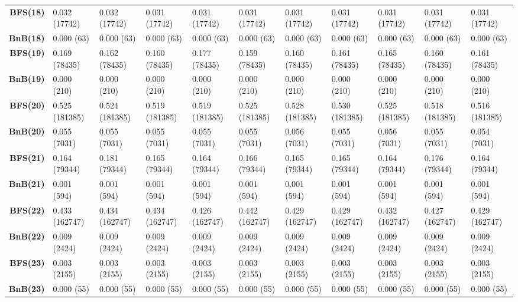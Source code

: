 \begin{table}[ht]
\begin{adjustbox}{width=1.5\textwidth,center}
\begin{tabular}{r|llllllllll}
\textbf{BFS(18)} & 0.032 (17742) & 0.032 (17742) & 0.031 (17742) & 0.031 (17742) & 0.031 (17742) & 0.031 (17742) & 0.031 (17742) & 0.031 (17742) & 0.031 (17742) & 0.031 (17742) \\
\textbf{BnB(18)} & 0.000 (63) & 0.000 (63) & 0.000 (63) & 0.000 (63) & 0.000 (63) & 0.000 (63) & 0.000 (63) & 0.000 (63) & 0.000 (63) & 0.000 (63) \\ \hline

\textbf{BFS(19)} & 0.169 (78435) & 0.162 (78435) & 0.160 (78435) & 0.177 (78435) & 0.159 (78435) & 0.160 (78435) & 0.161 (78435) & 0.165 (78435) & 0.160 (78435) & 0.161 (78435) \\
\textbf{BnB(19)} & 0.000 (210) & 0.000 (210) & 0.000 (210) & 0.000 (210) & 0.000 (210) & 0.000 (210) & 0.000 (210) & 0.000 (210) & 0.000 (210) & 0.000 (210) \\ \hline

\textbf{BFS(20)} & 0.525 (181385) & 0.524 (181385) & 0.519 (181385) & 0.519 (181385) & 0.525 (181385) & 0.528 (181385) & 0.530 (181385) & 0.525 (181385) & 0.518 (181385) & 0.516 (181385) \\
\textbf{BnB(20)} & 0.055 (7031) & 0.055 (7031) & 0.055 (7031) & 0.055 (7031) & 0.055 (7031) & 0.056 (7031) & 0.055 (7031) & 0.056 (7031) & 0.055 (7031) & 0.054 (7031) \\ \hline

\textbf{BFS(21)} & 0.164 (79344) & 0.181 (79344) & 0.165 (79344) & 0.164 (79344) & 0.166 (79344) & 0.165 (79344) & 0.165 (79344) & 0.164 (79344) & 0.176 (79344) & 0.164 (79344) \\
\textbf{BnB(21)} & 0.001 (594) & 0.001 (594) & 0.001 (594) & 0.001 (594) & 0.001 (594) & 0.001 (594) & 0.001 (594) & 0.001 (594) & 0.001 (594) & 0.001 (594) \\ \hline

\textbf{BFS(22)} & 0.433 (162747) & 0.434 (162747) & 0.434 (162747) & 0.426 (162747) & 0.442 (162747) & 0.429 (162747) & 0.429 (162747) & 0.432 (162747) & 0.427 (162747) & 0.429 (162747) \\
\textbf{BnB(22)} & 0.009 (2424) & 0.009 (2424) & 0.009 (2424) & 0.009 (2424) & 0.009 (2424) & 0.009 (2424) & 0.009 (2424) & 0.009 (2424) & 0.009 (2424) & 0.009 (2424) \\ \hline

\textbf{BFS(23)} & 0.003 (2155) & 0.003 (2155) & 0.003 (2155) & 0.003 (2155) & 0.003 (2155) & 0.003 (2155) & 0.003 (2155) & 0.003 (2155) & 0.003 (2155) & 0.003 (2155) \\
\textbf{BnB(23)} & 0.000 (55) & 0.000 (55) & 0.000 (55) & 0.000 (55) & 0.000 (55) & 0.000 (55) & 0.000 (55) & 0.000 (55) & 0.000 (55) & 0.000 (55) \\ \hline


\end{tabular}
\end{adjustbox}
\end{table}
